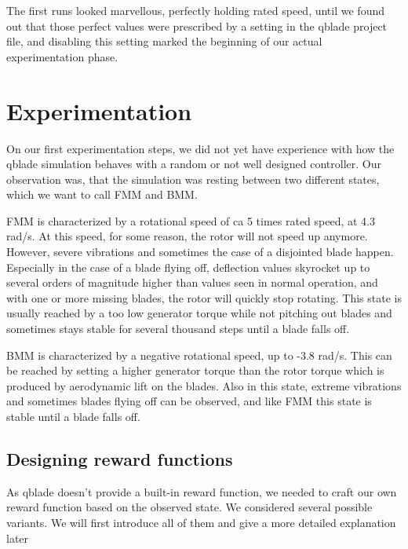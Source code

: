 \documentclass[hyperref,german,beleg]{cgvpub}
\begin{document}
The first runs looked marvellous, perfectly holding rated speed, until we found out that those perfect values were prescribed by a setting in the qblade project file, and disabling this setting marked the beginning of our actual experimentation phase.

\chapter{Experimentation}

On our first experimentation steps, we did not yet have experience with how the qblade simulation behaves with a random or not well designed controller. Our observation was, that the simulation was resting between two different states, which we want to call \ac{FMM} and \ac{BMM}.

\ac{FMM} is characterized by a rotational speed of ca 5 times rated speed, at 4.3 rad/s. At this speed, for some reason, the rotor will not speed up anymore. However, severe vibrations and sometimes the case of a disjointed blade happen. Especially in the case of a blade flying off, deflection values skyrocket up to several orders of magnitude higher than values seen in normal operation, and with one or more missing blades, the rotor will quickly stop rotating. This state is usually reached by a too low generator torque while not pitching out blades and sometimes stays stable for several thousand steps until a blade falls off.

\ac{BMM} is characterized by a negative rotational speed, up to -3.8 rad/s. This can be reached by setting a higher generator torque than the rotor torque which is produced by aerodynamic lift on the blades. Also in this state, extreme vibrations and sometimes blades flying off can be observed, and like \ac{FMM} this state is stable until a blade falls off. 


\section{Designing reward functions}

As qblade doesn't provide a built-in reward function, we needed to craft our own reward function based on the observed state. We considered several possible variants. We will first introduce all of them and give a more detailed explanation later
\end{document}
